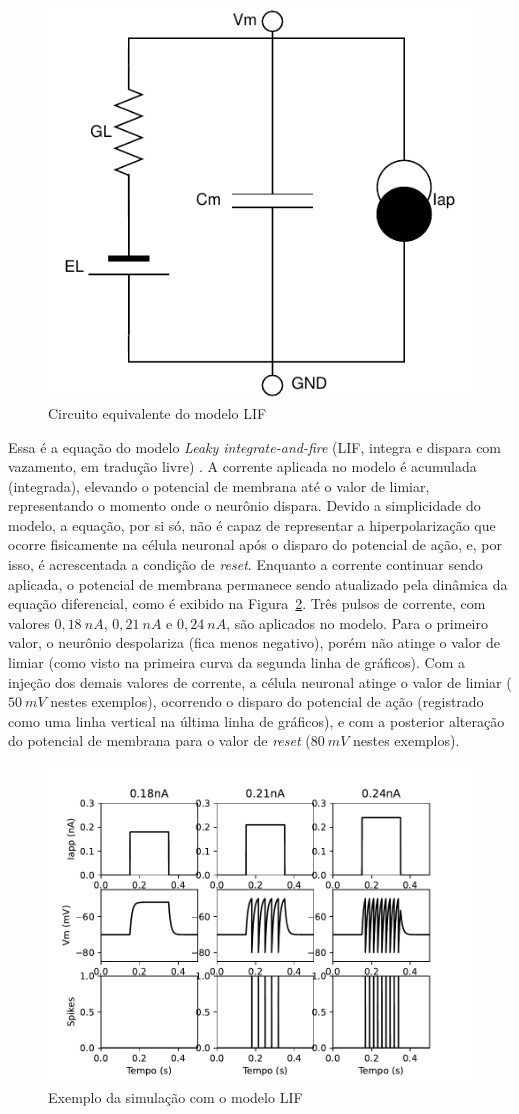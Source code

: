 \begin{figure}[htb!]
	\centering
	\caption{Circuito equivalente do modelo LIF}
	\label{fig:circuitolif}
	\includegraphics[width=0.5\linewidth]{figs/circuito_lif}
\end{figure}
Essa é a equação do modelo \textit{Leaky integrate-and-fire} (LIF, integra e dispara com vazamento, em tradução livre) \cite{lapicque_recherches_1907}. A corrente aplicada no modelo é acumulada (integrada), elevando o potencial de membrana até o valor de limiar, representando o momento onde o neurônio dispara. Devido a simplicidade do modelo, a equação, por si só, não é capaz de representar a hiperpolarização que ocorre fisicamente na célula neuronal após o disparo do potencial de ação, e, por isso, é acrescentada a condição de \textit{reset}. Enquanto a corrente continuar sendo aplicada, o potencial de membrana permanece sendo atualizado pela dinâmica da equação diferencial, como é exibido na Figura~\ref{fig:lif}. Três pulsos de corrente, com valores $0,18\ nA$, $0,21\ nA$ e $0,24\ nA$, são aplicados no modelo. Para o primeiro valor, o neurônio despolariza (fica menos negativo), porém não atinge o valor de limiar (como visto na primeira curva da segunda linha de gráficos). Com a injeção dos demais valores de corrente, a célula neuronal atinge o valor de limiar ($50\ mV$ nestes exemplos), ocorrendo o disparo do potencial de ação (registrado como uma linha vertical na última linha de gráficos), e com a posterior alteração do potencial de membrana para o valor de \textit{reset} ($80\ mV$ nestes exemplos).

\begin{figure}[htb!]
	\centering
	\caption[Exemplo da simulação com o modelo LIF]{Exemplo da simulação com o modelo LIF}
	\label{fig:lif}
	\includegraphics[width=0.7\linewidth]{figs/lif}
\end{figure}

